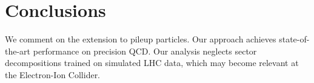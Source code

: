 \section{Conclusions}\label{sec:conclusions}

We comment on the extension to pileup particles. Our approach achieves
state-of-the-art performance on precision QCD. Our analysis neglects
sector decompositions trained on simulated LHC data, which may become
relevant at the Electron-Ion Collider.


